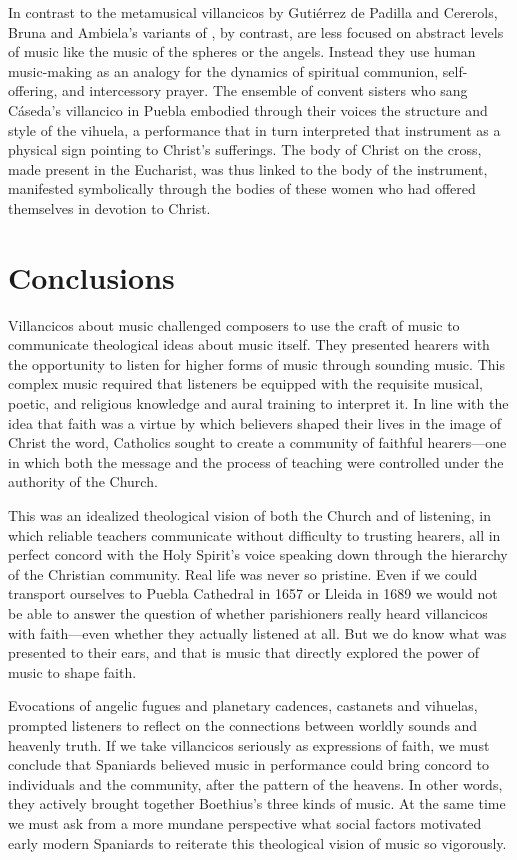 In contrast to the metamusical villancicos by Gutiérrez de Padilla and
Cererols, Bruna and Ambiela's variants of , by
contrast, are less focused on abstract levels of music like the music of the
spheres or the angels.
Instead they use human music-making as an analogy for the dynamics of spiritual
communion, self-offering, and intercessory prayer.
The ensemble of convent sisters who sang Cáseda's villancico in Puebla embodied
through their voices the structure and style of the vihuela, a performance that
in turn interpreted that instrument as a physical sign pointing to Christ's
sufferings.
The body of Christ on the cross, made present in the Eucharist, was thus linked
to the body of the instrument, manifested symbolically through the bodies of
these women who had offered themselves in devotion to Christ.

\section{Conclusions}

Villancicos about music challenged composers to use the craft of music to
communicate theological ideas about music itself.
They presented hearers with the opportunity to listen for higher forms of music
through sounding music.
This complex music required that listeners be equipped with the requisite
musical, poetic, and religious knowledge and aural training to interpret it.
In line with the idea that faith was a virtue by which believers shaped
their lives in the image of Christ the word, Catholics sought to create a
community of faithful hearers---one in which both the message and the process of
teaching were controlled under the authority of the Church.

This was an idealized theological vision of both the Church and of listening,
in which reliable teachers communicate without difficulty to trusting hearers,
all in perfect concord with the Holy Spirit's voice speaking down through the
hierarchy of the Christian community.
Real life was never so pristine.
Even if we could transport ourselves to Puebla Cathedral in 1657 or Lleida in
1689 we would not be able to answer the question of whether parishioners really
heard villancicos with faith---even whether they actually listened at all.
But we do know what was presented to their ears, and that is music that
directly explored the power of music to shape faith.

Evocations of angelic fugues and planetary cadences, castanets and vihuelas,
prompted listeners to reflect on the connections between worldly sounds and
heavenly truth.
If we take villancicos seriously as expressions of faith, we must conclude that
Spaniards believed music in performance could bring concord to individuals and
the community, after the pattern of the heavens.
In other words, they actively brought together Boethius's three kinds of music.
At the same time we must ask from a more mundane perspective what social
factors motivated early modern Spaniards to reiterate this theological vision
of music so vigorously.


